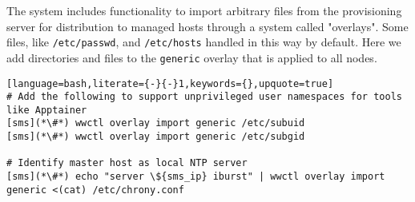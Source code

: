 The \Warewulf{} system includes functionality to import arbitrary files from
the provisioning server for distribution to managed hosts through a system 
called "overlays". Some files, like \texttt{/etc/passwd}, and \texttt{/etc/hosts}
handled in this way by default.  Here we add directories and files to the 
\texttt{generic} overlay that is applied to all nodes. 

\begin{lstlisting}[language=bash,literate={-}{-}1,keywords={},upquote=true]
# Add the following to support unprivileged user namespaces for tools like Apptainer
[sms](*\#*) wwctl overlay import generic /etc/subuid
[sms](*\#*) wwctl overlay import generic /etc/subgid

# Identify master host as local NTP server
[sms](*\#*) echo "server \${sms_ip} iburst" | wwctl overlay import generic <(cat) /etc/chrony.conf
\end{lstlisting}
